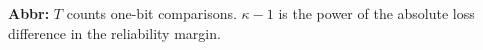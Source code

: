 \begin{table}[tp]
\begin{threeparttable}
\begin{tabularx}{\linewidth}{@{}>{\raggedright\arraybackslash}p{0.20\linewidth}>{\raggedright\arraybackslash}p{0.24\linewidth}>{\raggedright\arraybackslash}p{0.29\linewidth}>{\raggedright\arraybackslash}X@{}}
\bottomrule
\end{tabularx}
\begin{tablenotes}[flushleft]\footnotesize
\item[] \textbf{Abbr:} $T$ counts one-bit comparisons. $\kappa-1$ is the power of the absolute loss difference in the reliability margin.
\end{tablenotes}
\end{threeparttable}
\end{table}
